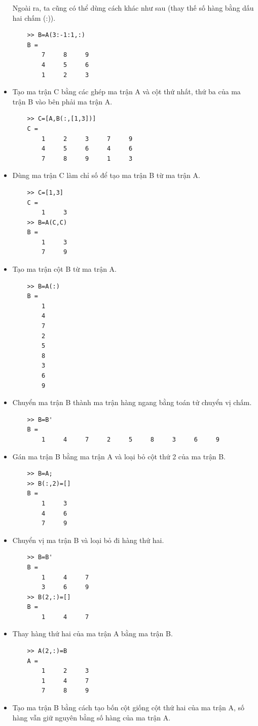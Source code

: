 \documentclass[12pt,a4paper]{article}
\begin{document}
\begin{example}
\begin{itemize}
Ngoài ra, ta cũng có thể dùng cách khác như sau (thay thế số hàng bằng dấu hai chấm (:)).
\begin{lstlisting}
	>> B=A(3:-1:1,:)
	B =
     	7     8     9
     	4     5     6
     	1     2     3
\end{lstlisting}
	\item Tạo ma trận C bằng các ghép ma trận A và cột thứ nhất, thứ ba của ma trận B vào bên phải ma trận A.
\begin{lstlisting}
	>> C=[A,B(:,[1,3])]
	C =
     	1     2     3     7     9
     	4     5     6     4     6
     	7     8     9     1     3
\end{lstlisting}
	\item Dùng ma trận C làm chỉ số để tạo ma trận B từ ma trận A.
\begin{lstlisting}
	>> C=[1,3]
	C =
     	1     3
	>> B=A(C,C)
	B =
     	1     3
     	7     9
\end{lstlisting}
	\item Tạo ma trận cột B từ ma trận A.
\begin{lstlisting}
	>> B=A(:)
	B =
     	1
     	4
     	7
     	2
     	5
     	8
     	3
     	6
     	9
\end{lstlisting}
	\item Chuyển ma trận B thành ma trận hàng ngang bằng toán tử chuyển vị chấm.
\begin{lstlisting}
	>> B=B'
	B =
     	1     4     7     2     5     8     3     6     9
\end{lstlisting}
	\item Gán ma trận B bằng ma trận A và loại bỏ cột thứ 2 của ma trận B.
\begin{lstlisting}
	>> B=A;
	>> B(:,2)=[]
	B =
     	1     3
     	4     6
     	7     9
\end{lstlisting}
	\item Chuyển vị ma trận B và loại bỏ đi hàng thứ hai.
\begin{lstlisting}
	>> B=B'
	B =
     	1     4     7
     	3     6     9
	>> B(2,:)=[]
	B =
     	1     4     7
\end{lstlisting}
	\item Thay hàng thứ hai của ma trận A bằng ma trận B.
\begin{lstlisting}
	>> A(2,:)=B
	A =
     	1     2     3
     	1     4     7
     	7     8     9
\end{lstlisting}
	\item Tạo ma trận B bằng cách tạo bốn cột giống cột thứ hai của ma trận A, số hàng vẫn giữ nguyên bằng số hàng của ma trận A.\\

\end{itemize}
\end{example}
\end{document}
